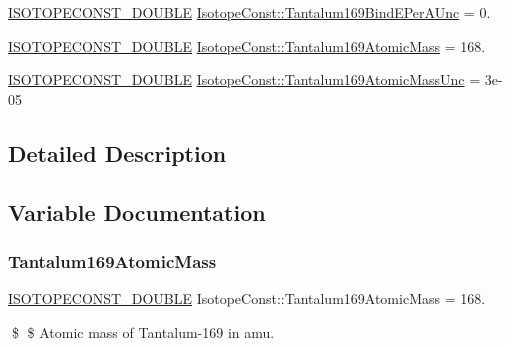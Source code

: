 \begin{DoxyCompactItemize}
\mbox{\hyperlink{group___isotope_const-_macros_ga8f45a7272ce02c0b4c65c44636ed719a}{I\+S\+O\+T\+O\+P\+E\+C\+O\+N\+S\+T\+\_\+\+D\+O\+U\+B\+LE}} \mbox{\hyperlink{group___isotope_const-_tantalum-_ta169_gaa0024436c4db45b83611a983f5cbde47}{Isotope\+Const\+::\+Tantalum169\+Bind\+E\+Per\+A\+Unc}} = 0.
\item 
\mbox{\hyperlink{group___isotope_const-_macros_ga8f45a7272ce02c0b4c65c44636ed719a}{I\+S\+O\+T\+O\+P\+E\+C\+O\+N\+S\+T\+\_\+\+D\+O\+U\+B\+LE}} \mbox{\hyperlink{group___isotope_const-_tantalum-_ta169_ga895aa8f4755f6f77e0c13eee70520c1e}{Isotope\+Const\+::\+Tantalum169\+Atomic\+Mass}} = 168.
\item 
\mbox{\hyperlink{group___isotope_const-_macros_ga8f45a7272ce02c0b4c65c44636ed719a}{I\+S\+O\+T\+O\+P\+E\+C\+O\+N\+S\+T\+\_\+\+D\+O\+U\+B\+LE}} \mbox{\hyperlink{group___isotope_const-_tantalum-_ta169_ga13e55760145502cd3a04cb7914d034c1}{Isotope\+Const\+::\+Tantalum169\+Atomic\+Mass\+Unc}} = 3e-\/05
\end{DoxyCompactItemize}


\subsection{Detailed Description}


\subsection{Variable Documentation}
\mbox{\label{group___isotope_const-_tantalum-_ta169_ga895aa8f4755f6f77e0c13eee70520c1e}} 
\subsubsection{\texorpdfstring{Tantalum169\+Atomic\+Mass}{Tantalum169AtomicMass}}
{\footnotesize\ttfamily \mbox{\hyperlink{group___isotope_const-_macros_ga8f45a7272ce02c0b4c65c44636ed719a}{I\+S\+O\+T\+O\+P\+E\+C\+O\+N\+S\+T\+\_\+\+D\+O\+U\+B\+LE}} Isotope\+Const\+::\+Tantalum169\+Atomic\+Mass = 168.}

\$ \$ Atomic mass of Tantalum-\/169 in amu. \mbox{\label{group___isotope_const-_tantalum-_ta169_ga13e55760145502cd3a04cb7914d034c1}} 
